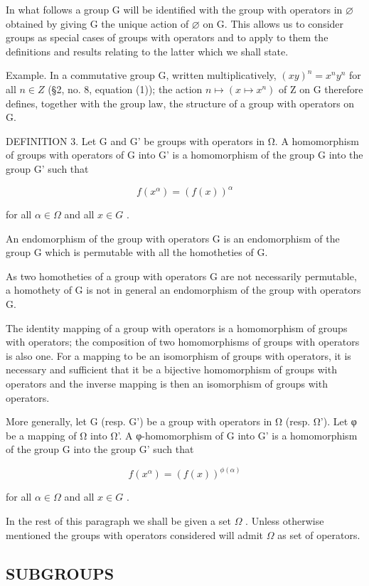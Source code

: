 In what follows a group G will be identified with the group with operators in \(\varnothing\) obtained by giving G the unique action of \(\varnothing\) on G. This allows us to consider groups as special cases of groups with operators and to apply to them the definitions and results relating to the latter which we shall state.

Example. In a commutative group G, written multiplicatively, \((xy)^{n} = x^{n}y^{n}\) for all \(n \in Z\) (§2, no. 8, equation (1)); the action \(n \mapsto (x \mapsto x^{n})\) of Z on G therefore defines, together with the group law, the structure of a group with operators on G.

DEFINITION 3. Let G and G' be groups with operators in Ω. A homomorphism of groups with operators of G into G' is a homomorphism of the group G into the group G' such that

\[
f (x ^ {\alpha}) = (f (x)) ^ {\alpha}
\]

for all \(\alpha \in \Omega\) and all \(x \in G\) .

An endomorphism of the group with operators G is an endomorphism of the group G which is permutable with all the homotheties of G.

As two homotheties of a group with operators G are not necessarily permutable, a homothety of G is not in general an endomorphism of the group with operators G.

The identity mapping of a group with operators is a homomorphism of groups with operators; the composition of two homomorphisms of groups with operators is also one. For a mapping to be an isomorphism of groups with operators, it is necessary and sufficient that it be a bijective homomorphism of groups with operators and the inverse mapping is then an isomorphism of groups with operators.

More generally, let G (resp. G') be a group with operators in Ω (resp. Ω'). Let φ be a mapping of Ω into Ω'. A φ-homomorphism of G into G' is a homomorphism of the group G into the group G' such that

\[
f (x ^ {\alpha}) = (f (x)) ^ {\phi (\alpha)}
\]

for all \(\alpha \in \Omega\) and all \(x \in G\) .

In the rest of this paragraph we shall be given a set \(\Omega\) . Unless otherwise mentioned the groups with operators considered will admit \(\Omega\) as set of operators.

\subsection{SUBGROUPS}

